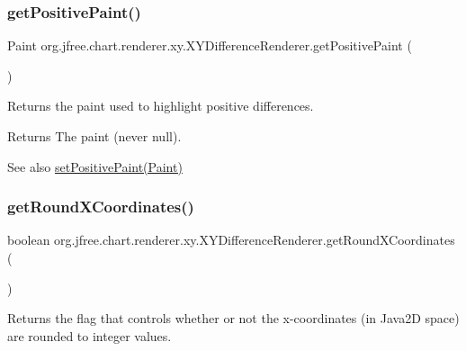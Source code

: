 \subsubsection{\texorpdfstring{get\+Positive\+Paint()}{getPositivePaint()}}
{\footnotesize\ttfamily Paint org.\+jfree.\+chart.\+renderer.\+xy.\+X\+Y\+Difference\+Renderer.\+get\+Positive\+Paint (\begin{DoxyParamCaption}{ }\end{DoxyParamCaption})}

Returns the paint used to highlight positive differences.

\begin{DoxyReturn}{Returns}
The paint (never {\ttfamily null}).
\end{DoxyReturn}
\begin{DoxySeeAlso}{See also}
\mbox{\hyperlink{classorg_1_1jfree_1_1chart_1_1renderer_1_1xy_1_1_x_y_difference_renderer_aff455c06592dff18318ed28661cb7860}{set\+Positive\+Paint(\+Paint)}} 
\end{DoxySeeAlso}
\mbox{\label{classorg_1_1jfree_1_1chart_1_1renderer_1_1xy_1_1_x_y_difference_renderer_aa98e8a1cd320c4a9f90c1f1d2727c2e6}} 
\subsubsection{\texorpdfstring{get\+Round\+X\+Coordinates()}{getRoundXCoordinates()}}
{\footnotesize\ttfamily boolean org.\+jfree.\+chart.\+renderer.\+xy.\+X\+Y\+Difference\+Renderer.\+get\+Round\+X\+Coordinates (\begin{DoxyParamCaption}{ }\end{DoxyParamCaption})}

Returns the flag that controls whether or not the x-\/coordinates (in Java2D space) are rounded to integer values.


